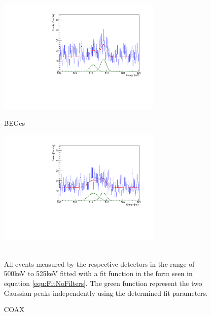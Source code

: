 \begin{figure}[t!]
	\centering
	\begin{minipage}{.5\textwidth}
		\centering
		\includegraphics[width=80mm]{./Bilder/500525FitNoFilterBEGes.pdf}
		\caption{BEGes}
		\label{fig:FitNoFilterBEGes}
	\end{minipage}%
	\begin{minipage}{.5\textwidth}
		\centering
		\includegraphics[width=80mm]{./Bilder/500525FitNoFilterCOAX.pdf}
		\caption{COAX}
		\label{fig:FitNoFilterCOAX}
	\end{minipage}
    \\
	\vspace{0.5cm}
	All events measured by the respective detectors in the range of 500keV to 525keV fitted with a fit function in the form seen in equation \ref{equ:FitNoFilters}. The green function represent the two Gaussian peaks independently using the determined fit parameters.
\vspace{0.5cm}
\end{figure}
\\

